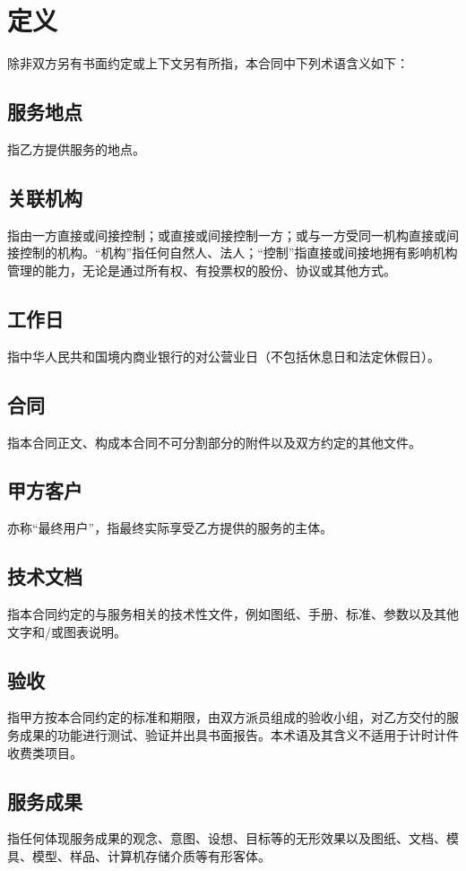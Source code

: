 \section{定义}
除非双方另有书面约定或上下文另有所指，本合同中下列术语含义如下：

\subsection{服务地点}
指乙方提供服务的地点。

\subsection{关联机构}
指由一方直接或间接控制；或直接或间接控制一方；或与一方受同一机构直接或间接控制的机构。“机构”指任何自然人、法人；“控制”指直接或间接地拥有影响机构管理的能力，无论是通过所有权、有投票权的股份、协议或其他方式。

\subsection{工作日}
指中华人民共和国境内商业银行的对公营业日（不包括休息日和法定休假日）。

\subsection{合同}
指本合同正文、构成本合同不可分割部分的附件以及双方约定的其他文件。

\subsection{甲方客户}
亦称“最终用户”，指最终实际享受乙方提供的服务的主体。

\subsection{技术文档}
指本合同约定的与服务相关的技术性文件，例如图纸、手册、标准、参数以及其他文字和/或图表说明。

\subsection{验收}
指甲方按本合同约定的标准和期限，由双方派员组成的验收小组，对乙方交付的服务成果的功能进行测试、验证并出具书面报告。本术语及其含义不适用于计时计件收费类项目。

\subsection{服务成果}
指任何体现服务成果的观念、意图、设想、目标等的无形效果以及图纸、文档、模具、模型、样品、计算机存储介质等有形客体。


